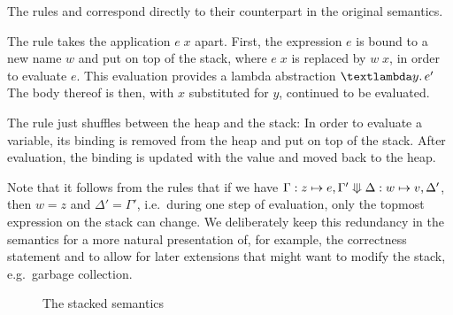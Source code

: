 \documentclass{scrartcl}
\newtheorem{lemma}{Lemma}
\theoremstyle{nonumberbreak}
\newcommand{\sApp}[2]{#1\;#2}
\newcommand{\sLam}[2]{\text{\textlambda} #1.\, #2}
\newcommand{\sLet}[2]{\text{\textsf{let}}\ #1\ \text{\textsf{in}}\ #2}
\newcommand{\ssred}[4]{#1 : #2 \mathrel{\rotatebox[origin=c]{90}{$\Lleftarrow$}} #3 : #4}
\newcommand{\sRule}[1]{\text{{\textsc{#1}}}}
\newcommand{\dom}[1]{\text{dom}\;#1}
\newcommand{\xeng}{x_1 = e_1, \ldots, x_n = e_n}
\newcommand{\xen}{x_1\mapsto e_1, \ldots, x_n\mapsto e_n}
\begin{document}
The rules \sRule{Lam} and \sRule{Let} correspond directly to their counterpart in the original semantics.

The rule \sRule{App} takes the application $\sApp e x$ apart. First, the expression $e$ is bound to a new name $w$ and put on top of the stack, where $\sApp e x$ is replaced by $\sApp w x$, in order to evaluate $e$. This evaluation provides a lambda abstraction $\sLam y {e'}$ The body thereof is then, with $x$ substituted for $y$, continued to be evaluated.

The rule \sRule{Var} just shuffles between the heap and the stack: In order to evaluate a variable, its binding is removed from the heap and put on top of the stack. After evaluation, the binding is updated with the value and moved back to the heap.

Note that it follows from the rules that if we have $\ssred \Gamma {z \mapsto e, \Gamma'} {\Delta} {w \mapsto v, \Delta'}$, then $w = z$ and $\Delta' = \Gamma'$, i.e.~during one step of evaluation, only the topmost expression on the stack can change. We deliberately keep this redundancy in the semantics for a more natural presentation of, for example, the correctness statement and to allow for later extensions that might want to modify the stack, e.g.~garbage collection.



\begin{figure}
\caption{The stacked semantics}
\label{fig:stacksem}
\end{figure}
\end{document}

